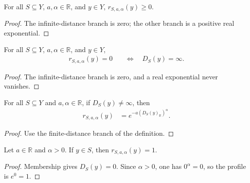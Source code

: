 \begin{lemma}
    \label{lem:exponential_distance_profile_nonneg}
    \leanok
    For all $S\subseteq Y$, $a,\alpha\in\mathbb R$, and $y\in Y$,
    $r_{S,a,\alpha}(y)\geq0$.
\end{lemma}
\begin{proof}
    \leanok
    The infinite-distance branch is zero; the other branch is a positive
    real exponential.
\end{proof}

\begin{lemma}
    \label{lem:exponential_distance_profile_zero}
    \leanok
    For all $S\subseteq Y$, $a,\alpha\in\mathbb R$, and $y\in Y$,
    \begin{align}
        r_{S,a,\alpha}(y)=0 & \quad\Longleftrightarrow\quad D_S(y)=\infty.
        \label{eq:exponential_distance_profile_zero}
    \end{align}
\end{lemma}
\begin{proof}
    \leanok
    The infinite-distance branch is zero, and a real exponential never
    vanishes.
\end{proof}

\begin{lemma}
    \label{lem:exponential_distance_profile_finite}
    \leanok
    For all $S\subseteq Y$ and $a,\alpha\in\mathbb R$, if $D_S(y)\ne\infty$,
    then
    \begin{align}
        r_{S,a,\alpha}(y) & =e^{-a(D_S(y)_{\mathbb R})^\alpha}.
        \label{eq:exponential_distance_profile_finite}
    \end{align}
\end{lemma}
\begin{proof}
    \leanok
    Use the finite-distance branch of the definition.
\end{proof}

\begin{lemma}
    \label{lem:exponential_distance_profile_mem}
    \leanok
    Let $a\in\mathbb R$ and $\alpha>0$.  If $y\in S$, then
    $r_{S,a,\alpha}(y)=1$.
\end{lemma}
\begin{proof}
    \leanok
    Membership gives $D_S(y)=0$.  Since $\alpha>0$, one has
    $0^\alpha=0$, so the profile is $e^0=1$.
\end{proof}

